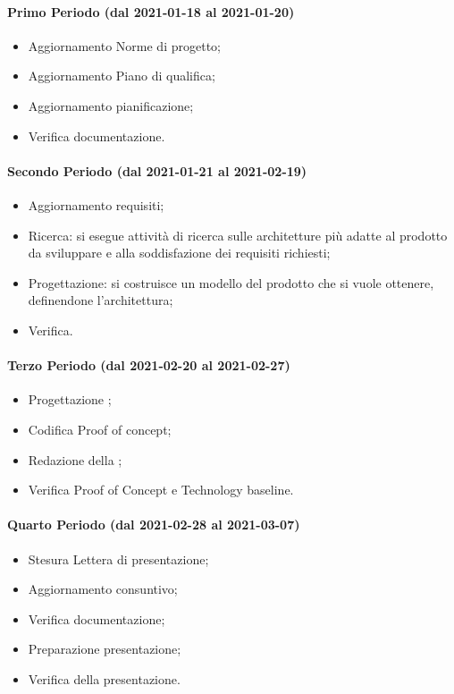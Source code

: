 \paragraph{Primo Periodo (dal 2021-01-18 al 2021-01-20)}
\begin{itemize}
	\item Aggiornamento Norme di progetto;
	\item Aggiornamento Piano di qualifica;
	\item Aggiornamento pianificazione;
	\item Verifica documentazione.
\end{itemize}

\paragraph{Secondo Periodo (dal 2021-01-21 al 2021-02-19)}
\begin{itemize}
	\item Aggiornamento requisiti;
	\item Ricerca: si esegue attività di ricerca sulle architetture più adatte al prodotto da sviluppare e alla soddisfazione dei requisiti richiesti;
	\item Progettazione: si costruisce un modello del prodotto che si vuole ottenere, definendone l'architettura;
	\item Verifica.
\end{itemize}

\paragraph{Terzo Periodo (dal 2021-02-20 al 2021-02-27)}
\begin{itemize}
	\item Progettazione ;
	\item Codifica Proof of concept;
	\item Redazione della  ;
	\item Verifica Proof of Concept e Technology baseline.
\end{itemize}

\paragraph{Quarto Periodo (dal 2021-02-28 al 2021-03-07)}
\begin{itemize}
	\item Stesura Lettera di presentazione;
	\item Aggiornamento consuntivo;
	\item Verifica documentazione;
	\item Preparazione presentazione;
	\item Verifica della presentazione.
\end{itemize}

